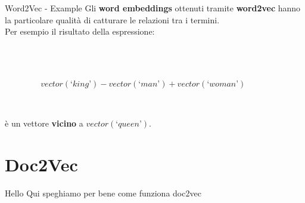 \documentclass[british]{beamer}
\begin{document}
\begin{frame}{Word2Vec - Example}
	Gli \textbf{word embeddings} ottenuti tramite \textbf{word2vec} hanno la particolare qualit\`{a} di catturare le relazioni tra i termini.\\
	Per esempio il risultato della espressione:
	\begin{columns}
		\begin{column}{0.15\textwidth}
			
		\end{column}
		\begin{column}{0.7\textwidth}
			\\~\\
			\(vector(‘king’) - vector(‘man’) + vector(‘woman’)\)
			\\~\\
		\end{column}
		\begin{column}{0.15\textwidth}
			
		\end{column}
	\end{columns}
	\`{e} un vettore \textbf{vicino} a \(vector(‘queen’)\).
\end{frame}

\section{Doc2Vec}

\begin{frame}{Hello}
	Qui speghiamo per bene come funziona doc2vec
\end{frame}
\end{document}
